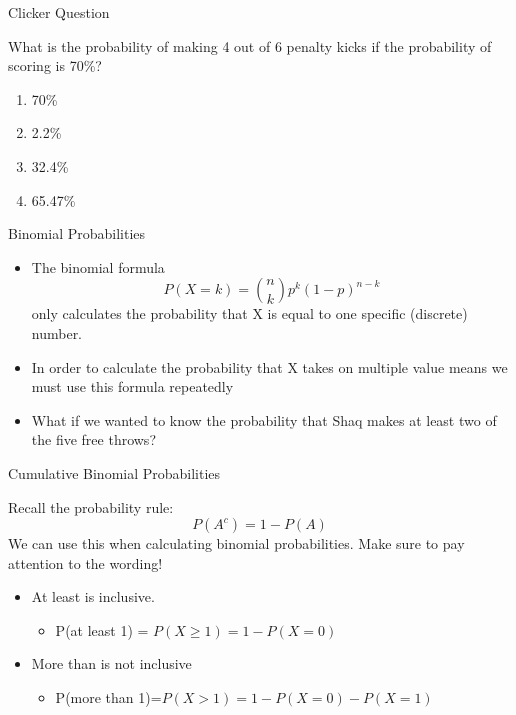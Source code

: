 \documentclass{beamer}
\begin{document}
\begin{frame}{Clicker Question}
	
	What is the probability of making 4 out of 6 penalty kicks if the probability of scoring is 70\%?
	
	\begin{enumerate}[label=(\alph*)]
		\item 70\%
		\item 2.2\%
		\item 32.4\%
		\item 65.47\%
		      
	\end{enumerate}
\end{frame}

\begin{frame}{Binomial Probabilities}
	
	\begin{itemize}
		\item The binomial formula
		$$P(X=k) = {n \choose k} p^k (1-p)^{n-k}$$
		only calculates the probability that X is equal to one specific (discrete) number.
		
		\item In order to calculate the probability that X takes on multiple value means we must use this formula repeatedly
		 
		\item What if we wanted to know the probability that Shaq makes at least two of the five free throws?
		
	\end{itemize}
	
\end{frame}

%

%

\begin{frame}{Cumulative Binomial Probabilities}
	
	Recall the probability rule:
	$$P(A^c)=1-P(A)$$
	We can use this when calculating binomial probabilities. Make sure to pay attention to the wording!
	
	\begin{itemize}
		\item \alert{At least} is inclusive. 
		      \begin{itemize}
		      	\item P(at least 1) = $P(X\geq1)=1-P(X=0)$
		      \end{itemize}
		\item \alert{More than} is not inclusive
		      \begin{itemize}
		      	\item P(more than 1)=$P(X>1)=1-P(X=0)-P(X=1)$
		      \end{itemize}
	\end{itemize}
	
\end{frame}
\end{document}
